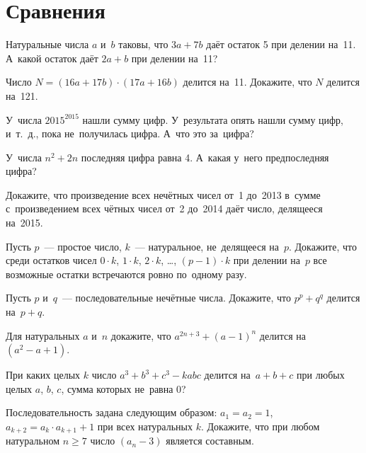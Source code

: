 
\section*{Сравнения}


\begin{problems}

\item
Натуральные числа $a$ и~$b$ таковы, что $3 a + 7 b$ даёт остаток 5 при делении
на~11.
А~какой остаток даёт $2 a + b$ при делении на~11?

\item
Число $N = (16 a + 17 b) \cdot(17 a + 16 b)$ делится на~11.
Докажите, что $N$ делится на~121.

\item
У~числа $2015^{2015}$ нашли сумму цифр.
У~результата опять нашли сумму цифр, и~т.~д., пока не~получилась цифра.
А~что это за~цифра?

\item
У~числа $n^2 + 2 n$ последняя цифра равна 4.
А~какая у~него предпоследняя цифра?

\item
Докажите, что произведение всех нечётных чисел от~1 до~2013 в~сумме
с~произведением всех чётных чисел от~2 до~2014 даёт число, делящееся на~2015.

\item
Пусть $p$~--- простое число, $k$~--- натуральное, не~делящееся на~$p$.
Докажите, что среди остатков чисел
$0 \cdot k$, $1 \cdot k$, $2 \cdot k$, \ldots, $(p - 1) \cdot k$ при делении
на~$p$ все возможные остатки встречаются ровно по~одному разу. 

\item
Пусть $p$ и~$q$~--- последовательные нечётные числа.
Докажите, что $p^p + q^q$ делится на~$p + q$. 

\item
Для натуральных $a$ и~$n$ докажите, что
$a^{2n+3} + (a - 1)^n$ делится на~$(a^2 - a + 1)$.


\item
При каких целых $k$ число $a^3 + b^3 + c^3 - k a b c$ делится на~$a + b + c$
при любых целых $a$, $b$, $c$, сумма которых не~равна 0?


\item
Последовательность задана следующим образом: $a_1 = a_2 = 1$,
$a_{k+2} = a_k \cdot a_{k+1} + 1$ при всех натуральных $k$.
Докажите, что при любом натуральном $n \geq 7$ число $(a_n - 3)$ является
составным.

\end{problems}


